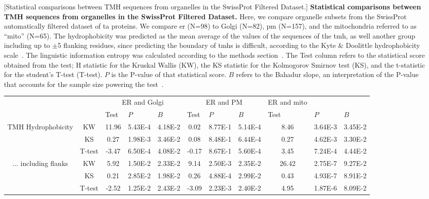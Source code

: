     \begin{table}[htbp]
    \centering
    [Statistical comparisons between TMH sequences from organelles in the SwissProt Filtered Dataset.]
    {\textbf{Statistical comparisons between TMH sequences from organelles in the SwissProt Filtered Dataset.}
    Here, we compare organelle subsets from the SwissProt automatically filtered dataset of \gls{ta} proteins.
    We compare \gls{er} (N=98) to Golgi (N=82), \gls{pm} (N=157), and the mitochondria referred to as ``mito'' (N=65).
    The hydrophobicity was predicted as the mean average of the values of the sequences of the \gls{tmh}, as well another group including up to $\pm$5 flanking residues, since predicting the boundary of \gls{tmh}s is difficult, according to the Kyte \& Doolittle hydrophobicity scale~\cite{Kyte1982}.
    The linguistic information entropy was calculated according to the methods section~\cite{Shannon1948}.
    The Test column refers to the statistical score obtained from the test; H statistic for the Kruskal Wallis (KW), the KS statistic for the Kolmogorov Smirnov test (KS), and the t-statistic for the student's T-test (T-test).
    $P$ is the P-value of that statistical score.
    $B$ refers to the Bahadur slope, an interpretation of the P-value that accounts for the sample size powering the test~\cite{Bahadur1967, Bahadur1971}.}
        \tiny

         \begin{tabular}{ccccccccccc}
                                &       & \multicolumn{3}{c}{ER and Golgi} & \multicolumn{3}{c}{ER and PM} & \multicolumn{1}{l}{ER and mito} &       &  \\
                                &       & \multicolumn{1}{l}{Test} & \multicolumn{1}{l}{$P$} & \multicolumn{1}{l}{$B$} & \multicolumn{1}{l}{Test} & \multicolumn{1}{l}{$P$} & \multicolumn{1}{l}{$B$} & \multicolumn{1}{l}{Test} & \multicolumn{1}{l}{$P$} & \multicolumn{1}{l}{$B$} \\

        \midrule
        \multirow{3}[0]{*}{TMH Hydrophobicity} &  KW & 11.96 & 5.43E-4 & 4.18E-2 & 0.02  & 8.77E-1 & 5.14E-4 & 8.46  & 3.64E-3 & 3.45E-2 \\
                                &  KS & 0.27  & 1.98E-3 & 3.46E-2 & 0.08  & 8.48E-1 & 6.44E-4 & 0.27  & 4.62E-3 & 3.30E-2 \\
                                &  T-test & -3.47 & 6.50E-4 & 4.08E-2 & -0.17 & 8.67E-1 & 5.60E-4 & 3.45  & 7.24E-4 & 4.44E-2 \\
        \midrule
        \multirow{3}[0]{*}{... including flanks} &  KW & 5.92  & 1.50E-2 & 2.33E-2 & 9.14  & 2.50E-3 & 2.35E-2 & 26.42 & 2.75E-7 & 9.27E-2 \\
                                &  KS & 0.21  & 2.85E-2 & 1.98E-2 & 0.26  & 4.88E-4 & 2.99E-2 & 0.43  & 4.93E-7 & 8.91E-2 \\
                                &  T-test & -2.52 & 1.25E-2 & 2.43E-2 & -3.09 & 2.23E-3 & 2.40E-2 & 4.95  & 1.87E-6 & 8.09E-2 \\
      \midrule


\end{tabular}
\end{table}
